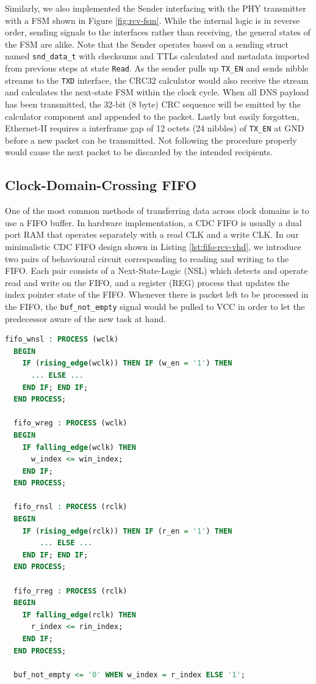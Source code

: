 \documentclass[a4paper]{report}
\newcommand{\code}{\texttt}
\begin{document}
Similarly, we also implemented the Sender interfacing with the PHY transmitter with a FSM shown in Figure \ref{fig:rcv-fsm}. While the internal logic is in reverse order, sending signals to the interfaces rather than receiving, the general states of the FSM are alike. Note that the Sender operates based on a sending struct named \code{snd\_data\_t} with checksums and TTLs calculated and metadata imported from previous steps at state \code{Read}. As the sender pulls up \code{TX\_EN} and sends nibble streams to the \code{TXD} interface, the CRC32 calculator would also receive the stream and calculates the next-state FSM within the clock cycle. When all DNS payload has been transmitted, the 32-bit (8 byte) CRC sequence will be emitted by the calculator component and appended to the packet. Lastly but easily forgotten, Ethernet-II requires a interframe gap of 12 octets (24 nibbles) of \code{TX\_EN} at GND before a new packet can be transmitted. Not following the procedure properly would cause the next packet to be discarded by the intended recipients.

\subsection{Clock-Domain-Crossing FIFO}

One of the most common methods of transferring data across clock domains is to use a FIFO buffer. In hardware implementation, a CDC FIFO is usually a dual port RAM that operates separately with a read CLK and a write CLK. In our minimalistic CDC FIFO design shown in Listing \ref{lst:fifo-rcv-vhd}, we introduce two pairs of behavioural circuit corresponding to reading and writing to the FIFO. Each pair consists of a Next-State-Logic (NSL) which detects and operate read and write on the FIFO, and a register (REG) process that updates the index pointer state of the FIFO. Whenever there is packet left to be processed in the FIFO, the \code{buf\_not\_empty} signal would be pulled to VCC in order to let the predecessor aware of the new task at hand.

\begin{lstlisting}[language=VHDL, caption=Snippet of FIFO \code{FIFO\_receive.vhd}, label={lst:fifo-rcv-vhd}]
  fifo_wnsl : PROCESS (wclk)
  BEGIN
    IF (rising_edge(wclk)) THEN IF (w_en = '1') THEN
      ... ELSE ...
    END IF; END IF;
  END PROCESS;

  fifo_wreg : PROCESS (wclk)
  BEGIN
    IF falling_edge(wclk) THEN
      w_index <= win_index;
    END IF;
  END PROCESS;

  fifo_rnsl : PROCESS (rclk)
  BEGIN
    IF (rising_edge(rclk)) THEN IF (r_en = '1') THEN
        ... ELSE ...
    END IF; END IF;
  END PROCESS;

  fifo_rreg : PROCESS (rclk)
  BEGIN
    IF falling_edge(rclk) THEN
      r_index <= rin_index;
    END IF;
  END PROCESS;

  buf_not_empty <= '0' WHEN w_index = r_index ELSE '1';
\end{lstlisting}
\end{document}
